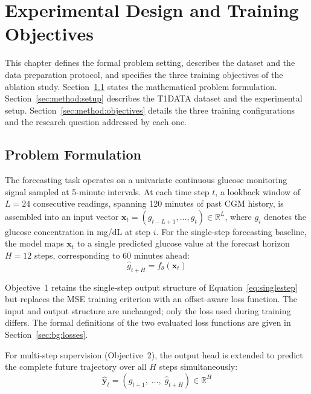 \chapter{Experimental Design and Training Objectives} \label{ch:method}
This chapter defines the formal problem setting, describes the dataset and the data preparation protocol, and specifies the three training objectives of the ablation study. Section~\ref{sec:method:problem} states the mathematical problem formulation. Section~\ref{sec:method:setup} describes the T1DATA dataset and the experimental setup. Section~\ref{sec:method:objectives} details the three training configurations and the research question addressed by each one.

\section{Problem Formulation} \label{sec:method:problem}

The forecasting task operates on a univariate continuous glucose monitoring signal sampled at 5-minute intervals. At each time step $t$, a lookback window of $L = 24$ consecutive readings, spanning 120 minutes of past CGM history, is assembled into an input vector $\mathbf{x}_t = (g_{t-L+1}, \ldots, g_t) \in \mathbb{R}^{L}$, where $g_i$ denotes the glucose concentration in mg/dL at step $i$. For the single-step forecasting baseline, the model maps $\mathbf{x}_t$ to a single predicted glucose value at the forecast horizon $H = 12$ steps, corresponding to 60 minutes ahead:
\begin{equation}
    \hat{g}_{t+H} = f_\theta(\mathbf{x}_t)
    \label{eq:singlestep}
\end{equation}

Objective~1 retains the single-step output structure of Equation~\ref{eq:singlestep} but replaces the MSE training criterion with an offset-aware loss function. The input and output structure are unchanged; only the loss used during training differs. The formal definitions of the two evaluated loss functions are given in Section~\ref{sec:bg:losses}.

For multi-step supervision (Objective~2), the output head is extended to predict the complete future trajectory over all $H$ steps simultaneously:
\begin{equation}
    \hat{\mathbf{y}}_t = (\hat{g}_{t+1},\; \ldots,\; \hat{g}_{t+H}) \in \mathbb{R}^{H}
    \label{eq:multistep}
\end{equation}

